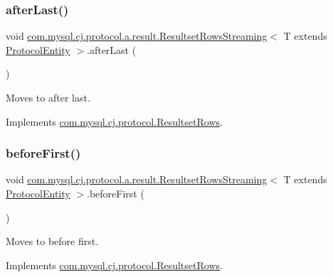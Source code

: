 \subsubsection{\texorpdfstring{after\+Last()}{afterLast()}}
{\footnotesize\ttfamily void \mbox{\hyperlink{classcom_1_1mysql_1_1cj_1_1protocol_1_1a_1_1result_1_1_resultset_rows_streaming}{com.\+mysql.\+cj.\+protocol.\+a.\+result.\+Resultset\+Rows\+Streaming}}$<$ T extends \mbox{\hyperlink{interfacecom_1_1mysql_1_1cj_1_1protocol_1_1_protocol_entity}{Protocol\+Entity}} $>$.after\+Last (\begin{DoxyParamCaption}{ }\end{DoxyParamCaption})}

Moves to after last. 

Implements \mbox{\hyperlink{interfacecom_1_1mysql_1_1cj_1_1protocol_1_1_resultset_rows_a9b69d770817c03e132e2561a228e5951}{com.\+mysql.\+cj.\+protocol.\+Resultset\+Rows}}.

\mbox{\label{classcom_1_1mysql_1_1cj_1_1protocol_1_1a_1_1result_1_1_resultset_rows_streaming_a09c61e1550747c9af885193ffe222c04}} 
\subsubsection{\texorpdfstring{before\+First()}{beforeFirst()}}
{\footnotesize\ttfamily void \mbox{\hyperlink{classcom_1_1mysql_1_1cj_1_1protocol_1_1a_1_1result_1_1_resultset_rows_streaming}{com.\+mysql.\+cj.\+protocol.\+a.\+result.\+Resultset\+Rows\+Streaming}}$<$ T extends \mbox{\hyperlink{interfacecom_1_1mysql_1_1cj_1_1protocol_1_1_protocol_entity}{Protocol\+Entity}} $>$.before\+First (\begin{DoxyParamCaption}{ }\end{DoxyParamCaption})}

Moves to before first. 

Implements \mbox{\hyperlink{interfacecom_1_1mysql_1_1cj_1_1protocol_1_1_resultset_rows_ae7c525fda08befaf356a5a0df5c78086}{com.\+mysql.\+cj.\+protocol.\+Resultset\+Rows}}.

